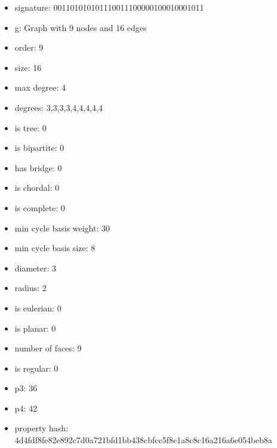 \newpage
\begin{figure}
\end{figure}
\begin{itemize}
\item signature: 001101010101110011100000100010001011
\item g: Graph with 9 nodes and 16 edges
\item order: 9
\item size: 16
\item max degree: 4
\item degrees: 3,3,3,3,4,4,4,4,4
\item is tree: 0
\item is bipartite: 0
\item has bridge: 0
\item is chordal: 0
\item is complete: 0
\item min cycle basis weight: 30
\item min cycle basis size: 8
\item diameter: 3
\item radius: 2
\item is eulerian: 0
\item is planar: 0
\item number of faces: 9
\item is regular: 0
\item p3: 36
\item p4: 42
\item property hash: 4d4fdf8fe82e892c7d0a721bfd1bb438cbfcc5f8e1a8c8c16a216a6e054beb8a
\end{itemize}
